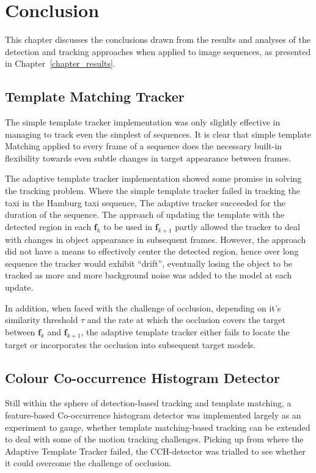 \chapter{Conclusion}
This chapter discusses the conclusions drawn from the results
and analyses of the detection and tracking approaches when applied to image
sequences, as presented in Chapter~\ref{chapter_results}.

\section{Template Matching Tracker}
The simple template tracker implementation was only slightly effective in
managing to track even the simplest of sequences. It is clear that simple template
Matching applied to every frame of a sequence does the necessary built-in
flexibility towards even subtle changes in target appearance between frames.

The adaptive template tracker implementation showed some promise in solving the
tracking problem. Where the simple template tracker failed in tracking the
taxi in the Hamburg taxi sequence, The adaptive tracker succeeded for the
duration of the sequence. 
The approach of updating the template with the detected region in each
$\mathbf{f}_k$ to be used in $\mathbf{f}_{k+1}$ partly allowed the tracker to
deal with changes in object appearance in subsequent frames. However, the
approach did not have a means to effectively center the detected region, hence
over long sequence the tracker would exhibit ``drift'', eventually losing the
object to be tracked as more and more background noise was added to the model at
each update.

In addition, when faced with the challenge of occlusion, depending on it's
similarity threshold $\tau$ and the rate at which the occlusion covers the
target between $\mathbf{f}_k$ and $\mathbf{f}_{k+1}$, the adaptive template
tracker either fails to locate the target or incorporates the occlusion into
subsequent target models.

\section{Colour Co-occurrence Histogram Detector}
Still within the sphere of detection-based tracking and template matching, a
feature-based Co-occurrence histogram detector was implemented largely as an
experiment to gauge, whether template matching-based tracking can be extended to deal
with some of the motion tracking challenges. 
Picking up from where the Adaptive Template Tracker failed, the CCH-detector was
trialled to see whether it could overcome the challenge of occlusion.

